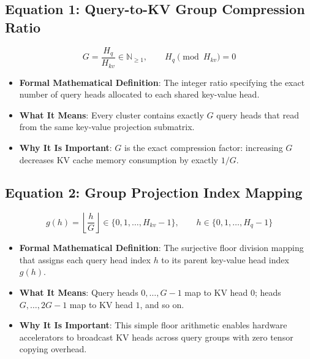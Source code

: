 \documentclass[11pt,a4paper]{article}
\theoremstyle{definition}
\begin{document}
\subsection{\textbf{Equation 1: Query-to-KV Group Compression Ratio}}
{\boldmath
\begin{equation}
G = \frac{H_q}{H_{kv}} \in \mathbb{N}_{\ge 1}, \qquad H_q \pmod{H_{kv}} = 0
\end{equation}
}
\begin{itemize}
    \item \textbf{Formal Mathematical Definition}:
    The integer ratio specifying the exact number of query heads allocated to each shared key-value head.
    \item \textbf{What It Means}:
    Every cluster contains exactly $G$ query heads that read from the same key-value projection submatrix.
    \item \textbf{Why It Is Important}:
    $G$ is the exact compression factor: increasing $G$ decreases KV cache memory consumption by exactly $1/G$.
\end{itemize}

\subsection{\textbf{Equation 2: Group Projection Index Mapping}}
{\boldmath
\begin{equation}
g(h) = \left\lfloor \frac{h}{G} \right\rfloor \in \{0, 1, \dots, H_{kv} - 1\}, \qquad h \in \{0, 1, \dots, H_q - 1\}
\end{equation}
}
\begin{itemize}
    \item \textbf{Formal Mathematical Definition}:
    The surjective floor division mapping that assigns each query head index $h$ to its parent key-value head index $g(h)$.
    \item \textbf{What It Means}:
    Query heads $0, \dots, G-1$ map to KV head $0$; heads $G, \dots, 2G-1$ map to KV head $1$, and so on.
    \item \textbf{Why It Is Important}:
    This simple floor arithmetic enables hardware accelerators to broadcast KV heads across query groups with zero tensor copying overhead.
\end{itemize}
\end{document}
